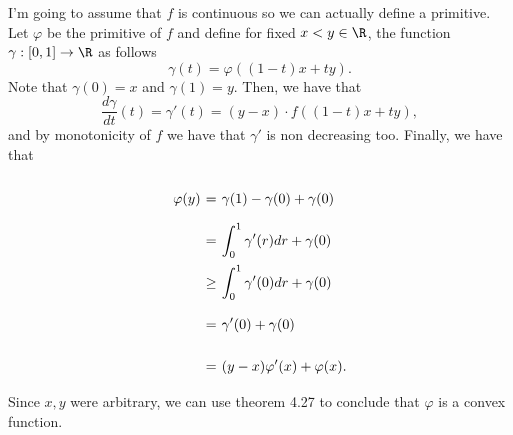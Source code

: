 I'm going to assume that $f$ is continuous so we can actually define a primitive. Let $\varphi$ be the primitive of $f$ and define for fixed $x<y\in \R$, the function $\gamma: [0,1] \to \R$ as follows
\[ \gamma(t) = \varphi((1-t)x + t y). \]
Note that $\gamma(0) = x$ and $\gamma(1) = y$. Then, we have that
\[ \frac{d\gamma}{dt}(t) = \gamma'(t) = (y-x)\cdot f((1-t)x + t y), \]
and by monotonicity of $f$ we have that $\gamma'$ is non decreasing too. Finally, we have that
\[ \everymath{\displaystyle}
\arraycolsep=1.8pt\def\arraystretch{2.5}
\begin{array}{rcl}
    \varphi(y) & = & \gamma(1) - \gamma(0) + \gamma(0)\\
    & = & \int_0^{1} \gamma'(r) dr + \gamma(0)\\
    & \geq & \int_0^{1} \gamma'(0) dr + \gamma(0)\\
    & = & \gamma'(0) + \gamma(0)\\
    & = & (y-x) \varphi'(x) + \varphi(x).
\end{array} \]
Since $x,y$ were arbitrary, we can use theorem 4.27 to conclude that $\varphi$ is a convex function.